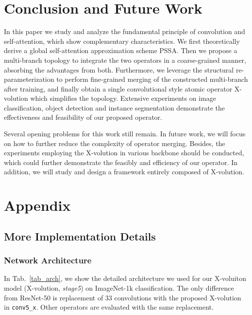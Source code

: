 \documentclass{article}
\begin{document}
\vspace{2mm}
\section{Conclusion and Future Work}
\label{sec_5}
In this paper we study and analyze the fundamental principle of convolution and self-attention, which show complementary characteristics.
We first theoretically derive a global self-attention approximation scheme PSSA. 
Then we propose a multi-branch topology to integrate the two operators in a coarse-grained manner, absorbing the advantages from both.
Furthermore, we leverage the structural re-parameterization to perform fine-grained merging of the constructed multi-branch after training, and finally obtain a single convolutional style atomic operator X-volution which simplifies the topology.
Extensive experiments on image classification, object detection and instance segmentation demonstrate the effectiveness and feasibility of our proposed operator.

Several opening problems for this work still remain.
In future work, we will focus on how to further reduce the complexity of operator merging.
Besides, the experiments employing the X-volution in various backbone should be conducted, which could further demonstrate the feasibly and efficiency of our operator.
In addition, we will study and design a framework entirely composed of X-volution.






\clearpage
\section{Appendix}
\subsection{More Implementation Details} 
\label{supp_sec1}
\subsubsection{Network Architecture}
In Tab.~\ref{tab_arch}, we show the detailed architecture we used for our X-voluiton model (X-volution, \textit{stage5}) on ImageNet-1k classification. The only difference from ResNet-50 is replacement of 33 convolutions with the proposed X-volution in \texttt{conv5\_x}. Other operators are evaluated with the same replacement.

\newcommand{\blockb}[3]{\multirow{3}{*}{
#3}
}
\end{document}

